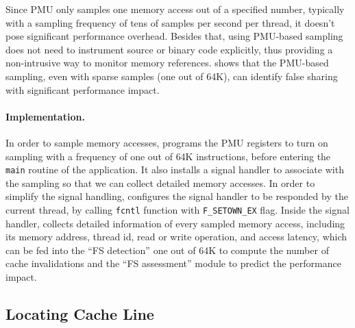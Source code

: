 Since PMU only samples one memory access out of a specified number, typically with a sampling frequency of tens of samples per second per thread, it doesn't pose significant performance overhead. Besides that, using PMU-based sampling does not need to instrument source or binary code explicitly, thus providing a non-intrusive way to monitor memory references. \cheetah{} shows that the PMU-based sampling, even with sparse samples (one out of 64K), can identify false sharing with significant performance impact.
 

\paragraph{Implementation.} 

In order to sample memory accesses, \cheetah{} programs the PMU registers to turn on sampling with a frequency of one out of 64K instructions, before entering the \texttt{main} routine of the application. It also installs a signal handler to associate with the sampling so that we can collect detailed memory accesses. In order to simplify the signal handling, \Cheetah{} configures the signal handler to be responded by the current thread, by calling \texttt{fcntl} function with \texttt{F\_SETOWN\_EX} flag. Inside the signal handler, \Cheetah{} collects detailed information of every sampled memory access, including its memory address, thread id, read or write operation, and access latency, which can be fed into the ``FS detection'' one out of 64K to compute the number of cache invalidations and the ``FS assessment'' module to predict the performance impact.

\subsection{Locating Cache Line}
\label{sec:shadow}

